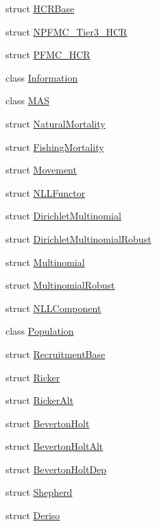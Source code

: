 \begin{DoxyCompactItemize}
\item 
struct \hyperlink{structmas_1_1_h_c_r_base}{H\-C\-R\-Base}
\item 
struct \hyperlink{structmas_1_1_n_p_f_m_c___tier3___h_c_r}{N\-P\-F\-M\-C\-\_\-\-Tier3\-\_\-\-H\-C\-R}
\item 
struct \hyperlink{structmas_1_1_p_f_m_c___h_c_r}{P\-F\-M\-C\-\_\-\-H\-C\-R}
\item 
class \hyperlink{classmas_1_1_information}{Information}
\item 
class \hyperlink{classmas_1_1_m_a_s}{M\-A\-S}
\item 
struct \hyperlink{structmas_1_1_natural_mortality}{Natural\-Mortality}
\item 
struct \hyperlink{structmas_1_1_fishing_mortality}{Fishing\-Mortality}
\item 
struct \hyperlink{structmas_1_1_movement}{Movement}
\item 
struct \hyperlink{structmas_1_1_n_l_l_functor}{N\-L\-L\-Functor}
\item 
struct \hyperlink{structmas_1_1_dirichlet_multinomial}{Dirichlet\-Multinomial}
\item 
struct \hyperlink{structmas_1_1_dirichlet_multinomial_robust}{Dirichlet\-Multinomial\-Robust}
\item 
struct \hyperlink{structmas_1_1_multinomial}{Multinomial}
\item 
struct \hyperlink{structmas_1_1_multinomial_robust}{Multinomial\-Robust}
\item 
struct \hyperlink{structmas_1_1_n_l_l_component}{N\-L\-L\-Component}
\item 
class \hyperlink{classmas_1_1_population}{Population}
\item 
struct \hyperlink{structmas_1_1_recruitment_base}{Recruitment\-Base}
\item 
struct \hyperlink{structmas_1_1_ricker}{Ricker}
\item 
struct \hyperlink{structmas_1_1_ricker_alt}{Ricker\-Alt}
\item 
struct \hyperlink{structmas_1_1_beverton_holt}{Beverton\-Holt}
\item 
struct \hyperlink{structmas_1_1_beverton_holt_alt}{Beverton\-Holt\-Alt}
\item 
struct \hyperlink{structmas_1_1_beverton_holt_dep}{Beverton\-Holt\-Dep}
\item 
struct \hyperlink{structmas_1_1_shepherd}{Shepherd}
\item 
struct \hyperlink{structmas_1_1_deriso}{Deriso}
\item 

\end{DoxyCompactItemize}
